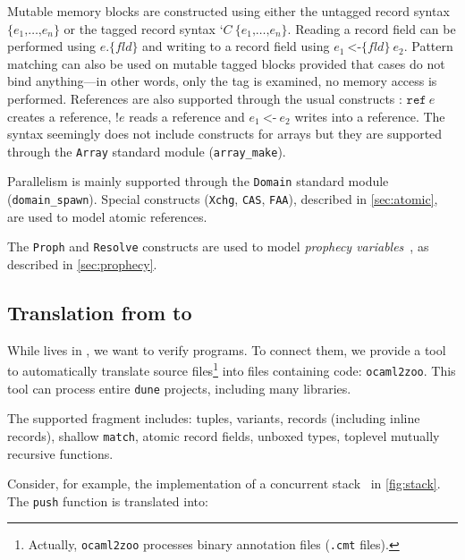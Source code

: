 Mutable memory blocks are constructed using either the untagged record syntax $\texttt{\{} e_1 \texttt{,} \dots \texttt{,} e_n \texttt{\}}$ or the tagged record syntax $\texttt{‘} C\ \texttt{\{} e_1 \texttt{,} \dots \texttt{,} e_n \texttt{\}}$.
Reading a record field can be performed using $e \texttt{.\{} \mathit{fld} \texttt{\}}$ and writing to a record field using $e_1\ \texttt{<-\{} \mathit{fld} \texttt{\}}\ e_2$.
Pattern matching can also be used on mutable tagged blocks provided that cases do not bind anything---in other words, only the tag is examined, no memory access is performed.
References are also supported through the usual constructs : $\texttt{ref}\ e$ creates a reference, $\texttt{!} e$ reads a reference and $e_1\ \texttt{<-}\ e_2$ writes into a reference.
The syntax seemingly does not include constructs for arrays but they are supported through the \texttt{Array} standard module (\eg \texttt{array\_make}).

Parallelism is mainly supported through the \texttt{Domain} standard module (\eg \texttt{domain\_spawn}).
Special constructs (\texttt{Xchg}, \texttt{CAS}, \texttt{FAA}), described in \cref{sec:atomic}, are used to model atomic references.

The \texttt{Proph} and \texttt{Resolve} constructs are used to model \emph{prophecy variables}~\cite{DBLP:journals/pacmpl/JungLPRTDJ20}, as described in \cref{sec:prophecy}.

\subsection{Translation from \OCaml to \ZooLang}

While \ZooLang lives in \Rocq, we want to verify \OCaml programs.
To connect them, we provide a tool to automatically translate \OCaml source files\footnote{Actually, \texttt{ocaml2zoo} processes binary annotation files (\texttt{.cmt} files).} into \Rocq files containing \ZooLang code: \texttt{ocaml2zoo}.
This tool can process entire \texttt{dune} projects, including many libraries.

The supported \OCaml fragment includes: tuples, variants, records (including inline records), shallow \texttt{match}, atomic record fields, unboxed types, toplevel mutually recursive functions.

Consider, for example, the \OCaml implementation of a concurrent stack~\cite{thomas1986systems} in \cref{fig:stack}.
The \texttt{push} function is translated into:

